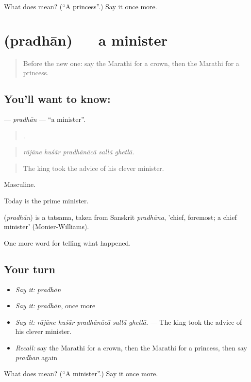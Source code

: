 \begin{tcolorbox}[breakable,colback=teal!4,colframe=teal!35!black,title={Before you move on}]
What does  mean? (\textquotedblleft{}A princess\textquotedblright{}.) Say it once more.
\end{tcolorbox}
\section[\texorpdfstring{\mr{प्रधान} (pradhān)}{प्रधान (pradhān)}]{ (pradhān) — a minister}

\label{lesson:MR-C326-pradhan}



\begin{quote}
Before the new one: say the Marathi for a crown, then the Marathi for a princess.
\end{quote}

\subsection*{You'll want to know: }
\textbf{} — \emph{pradhān} — \textquotedblleft{}a minister\textquotedblright{}.

\begin{quote}
    .
\end{quote}

\begin{quote}
\emph{rājāne huśār pradhānācā sallā ghetlā.}
\end{quote}

\begin{quote}
The king took the advice of his clever minister.
\end{quote}

Masculine.

Today  is the prime minister.

\begin{cousinweb}
\textbf{} (\emph{pradhān}) is a tatsama, taken from Sanskrit \emph{pradhāna}, 'chief, foremost; a chief minister' (Monier-Williams).
\end{cousinweb}

\begin{grammarlens}[title={What you've built}]
One more word for telling what happened.
\end{grammarlens}

\subsection*{Your turn}
\begin{itemize}
\raggedright
  \item \emph{Say it:} \emph{pradhān}
  \item \emph{Say it:} \emph{pradhān}, once more
  \item \emph{Say it:} \emph{rājāne huśār pradhānācā sallā ghetlā.} — The king took the advice of his clever minister.
  \item \emph{Recall:} say the Marathi for a crown, then the Marathi for a princess, then say \emph{pradhān} again
\end{itemize}

\begin{tcolorbox}[breakable,colback=teal!4,colframe=teal!35!black,title={Before you move on}]
What does  mean? (\textquotedblleft{}A minister\textquotedblright{}.) Say it once more.
\end{tcolorbox}
